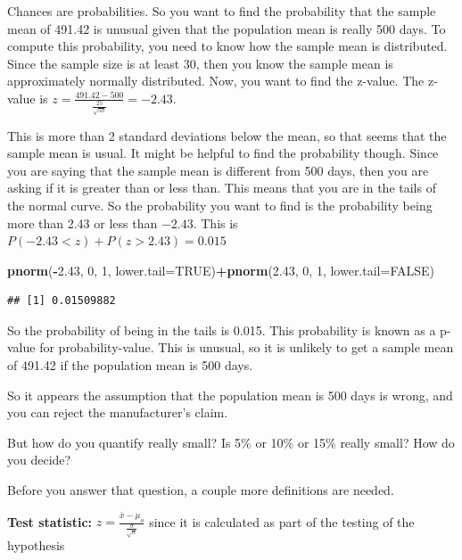 \documentclass[
]{book}
\newenvironment{Shaded}{\begin{snugshade}}{\end{snugshade}}
\newcommand{\DataTypeTok}[1]{\textcolor[rgb]{0.13,0.29,0.53}{#1}}
\newcommand{\DecValTok}[1]{\textcolor[rgb]{0.00,0.00,0.81}{#1}}
\newcommand{\FloatTok}[1]{\textcolor[rgb]{0.00,0.00,0.81}{#1}}
\newcommand{\KeywordTok}[1]{\textcolor[rgb]{0.13,0.29,0.53}{\textbf{#1}}}
\newcommand{\NormalTok}[1]{#1}
\newcommand{\OperatorTok}[1]{\textcolor[rgb]{0.81,0.36,0.00}{\textbf{#1}}}
\newcommand{\OtherTok}[1]{\textcolor[rgb]{0.56,0.35,0.01}{#1}}
\begin{document}
Chances are probabilities. So you want to find the probability that the sample mean of 491.42 is unusual given that the population mean is really 500 days. To compute this probability, you need to know how the sample mean is distributed. Since the sample size is at least 30, then you know the sample mean is approximately normally distributed. Now, you want to find the z-value. The z-value is \(z=\frac{491.42-500}{\frac{25}{\sqrt{50}}}=-2.43\).

This is more than 2 standard deviations below the mean, so that seems that the sample mean is usual. It might be helpful to find the probability though. Since you are saying that the sample mean is different from 500 days, then you are asking if it is greater than or less than. This means that you are in the tails of the normal curve. So the probability you want to find is the probability being more than 2.43 or less than \(-2.43\). This is \(P(-2.43<z)+P(z>2.43)=0.015\)

\begin{Shaded}
\begin{Highlighting}[]
\KeywordTok{pnorm}\NormalTok{(}\OperatorTok{-}\FloatTok{2.43}\NormalTok{, }\DecValTok{0}\NormalTok{, }\DecValTok{1}\NormalTok{, }\DataTypeTok{lower.tail=}\OtherTok{TRUE}\NormalTok{)}\OperatorTok{+}\KeywordTok{pnorm}\NormalTok{(}\FloatTok{2.43}\NormalTok{, }\DecValTok{0}\NormalTok{, }\DecValTok{1}\NormalTok{, }\DataTypeTok{lower.tail=}\OtherTok{FALSE}\NormalTok{)}
\end{Highlighting}
\end{Shaded}

\begin{verbatim}
## [1] 0.01509882
\end{verbatim}

So the probability of being in the tails is 0.015. This probability is known as a p-value for probability-value. This is unusual, so it is unlikely to get a sample mean of 491.42 if the population mean is 500 days.

So it appears the assumption that the population mean is 500 days is wrong, and you can reject the manufacturer's claim.

But how do you quantify really small? Is 5\% or 10\% or 15\% really small? How do you decide?

Before you answer that question, a couple more definitions are needed.

\textbf{Test statistic:} \(z=\frac{\bar{x}-\mu_o}{\frac{\sigma}{\sqrt{n}}}\) since it is calculated as part of the testing of the hypothesis
\end{document}
